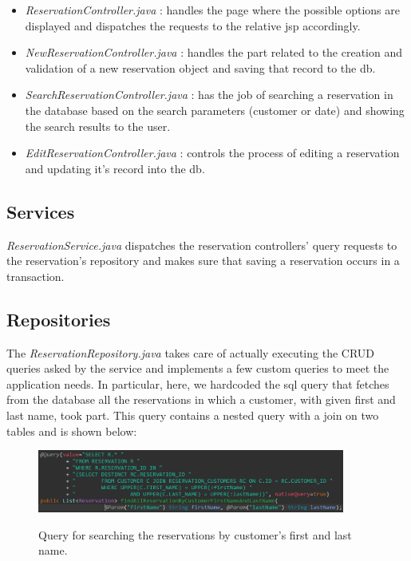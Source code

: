 \documentclass{article}
\begin{document}
\begin{itemize}
	\item \textit{ReservationController.java} : handles the page where the possible
	options are displayed and dispatches the requests to the relative jsp accordingly.
	
	\item \textit{NewReservationController.java} : handles the part related to the 
		creation and validation of a new reservation object and saving that
		 record to the db.
		
	\item \textit{SearchReservationController.java} : has the job of searching a
	reservation in the database based on the search parameters (customer or date) and
	showing the search results to the user.
	
	\item \textit{EditReservationController.java} : controls the process of editing 
	a reservation and updating it's record into the db.

\end{itemize}



\subsection*{Services}
\textit{ReservationService.java} dispatches the reservation controllers' query requests to the reservation's repository 
and makes sure that saving a reservation occurs in a transaction.


\subsection*{Repositories}
The \textit{ReservationRepository.java} takes care of actually executing the CRUD queries
asked by the service and implements a few custom queries to meet the application needs.
In particular, here, we hardcoded the sql query that fetches from the database
all the reservations in which a customer, with given first and last name, took part.
This query contains a nested query with a join on two tables and is shown below:

\vspace{5mm}

\begin{figure}[H]
    \centering
    \includegraphics[width=0.9\textwidth]{images/custom_query}
    \label{fig:custom_query}
    \caption{Query for searching the reservations by customer's first and last name.}
\end{figure}
\end{document}
